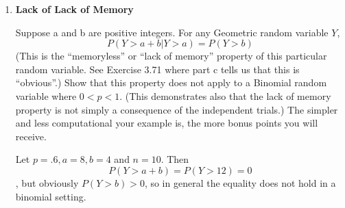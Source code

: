 \documentclass{scrartcl}
\begin{document}
\begin{enumerate}
\begin{enumerate}[a)]
\end{enumerate}

\item \textbf{Lack of Lack of Memory}

Suppose a and b are positive integers. For any Geometric random variable $Y$, $$P(Y > a + b | Y > a) = P(Y > b)$$
(This is the “memoryless” or “lack of memory” property of this particular random variable. See Exercise 3.71 where part c tells us that this is “obvious”.) Show that this property does not apply to a Binomial random variable where $0 < p < 1$. (This demonstrates also that the lack of memory property is not simply a consequence of the independent trials.) The simpler and less computational your example is, the more bonus points you will receive.

Let $p = .6, a = 8, b = 4$ and $n = 10$. Then $$P(Y>a+b)=P(Y>12)=0$$, but obviously $P(Y>b)>0$, so in general the equality does not hold in a binomial setting.

\end{enumerate}
\end{document}
